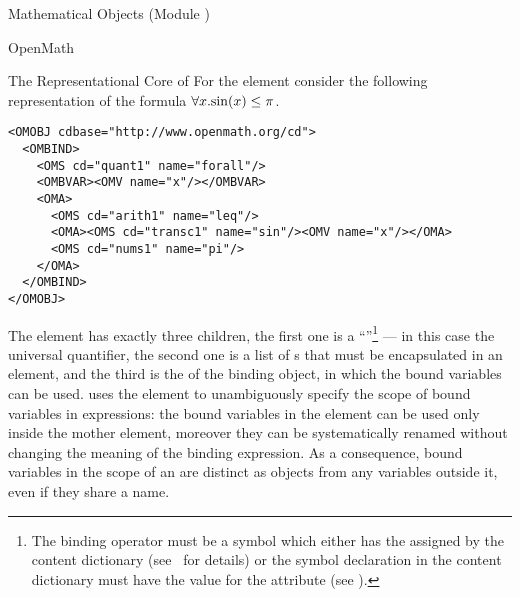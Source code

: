\begin{tchapter}[id=mobj,short=Mathematical Objects]{Mathematical Objects (Module {})}
\begin{tsection}[id=openmath]{OpenMath}
\begin{tsubsection}[id=om:core]{The Representational Core of {\openmath}}
For the {} element consider the following representation of the
formula ${\forall{x}.{\sin(x)\leq\pi}}$.
\begin{lstlisting}[label=allxsinx,language=OpenMath,numbers=none,
   index={OMOBJ,OMA,OMV,OMBIND,OMBVAR}]
<OMOBJ cdbase="http://www.openmath.org/cd">
  <OMBIND>
    <OMS cd="quant1" name="forall"/>
    <OMBVAR><OMV name="x"/></OMBVAR>
    <OMA>
      <OMS cd="arith1" name="leq"/>
      <OMA><OMS cd="transc1" name="sin"/><OMV name="x"/></OMA>
      <OMS cd="nums1" name="pi"/>
    </OMA>
  </OMBIND>
</OMOBJ>   
\end{lstlisting}
The {} element has exactly three children, the first one is a
``{}''\footnote{\label{foot:binding-operator}The binding
  operator must be a symbol which either has the {}
  {} assigned by the {\openmath} content dictionary
  (see~\cite{BusCapCar:2oms04} for details) or the symbol declaration in the {\omdoc}
  content dictionary must have the value {} for the attribute
  {} (see {}).} --- in this case the
universal quantifier, the second one is a list of {s} that must
be encapsulated in an {} element, and the third is the
{} of the binding object, in which the bound variables can be used.
{\openmath} uses the {} element to unambiguously specify the
scope of bound variables in expressions: the bound variables in the
{} element can be used only inside the mother
{} element, moreover they can be systematically
renamed without changing the meaning of the binding
expression. As a consequence, bound variables in the scope of an
{} are distinct as {\openmath} objects from any variables
outside it, even if they share a name.


\end{tsubsection}
\end{tsection}
\end{tchapter}
